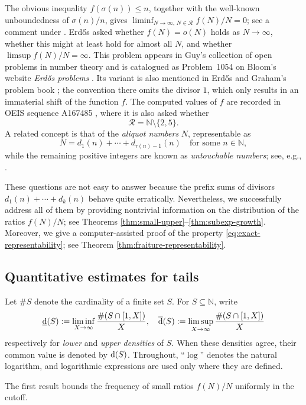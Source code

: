 \documentclass[11pt,letterpaper,reqno]{amsart}
\numberwithin{equation}{section}
\theoremstyle{remark}
\newcommand{\N}{\mathbb{N}}
\newcommand{\Rcal}{\mathcal{R}}
\newcommand{\lowerdens}{\underline{\textup{d}}}
\newcommand{\upperdens}{\overline{\textup{d}}}
\renewcommand{\leq}{\leqslant}
\begin{document}
The obvious inequality $f(\sigma(n))\leq n$, together with the
well-known unboundedness of $\sigma(n)/n$, gives
$\liminf_{N\to\infty,\,N\in\Rcal}f(N)/N=0$; see a comment under \cite{OEIS1054}.
Erd\H{o}s asked whether $f(N)=o(N)$ holds as $N\to\infty$, whether this might at least hold for almost all $N$, and whether $\limsup f(N)/N=\infty$.
This problem appears in Guy's collection of open problems in number theory \cite[Problem B2]{Guy} and is
catalogued as Problem~1054 on Bloom's website \emph{Erd\H{o}s problems} \cite{Bloom1054}. Its variant is also mentioned in
Erd\H{o}s and Graham's problem book \cite[p.~93]{ErdosGraham}; the convention there omits the divisor $1$, which only results in an immaterial shift of the function $f$.
The computed values of $f$ are recorded in OEIS sequence A167485 \cite{OEIS1054}, where it is also asked whether
\begin{equation}\label{eq:exact-representability}
 \Rcal=\N\setminus\{2,5\}.
\end{equation}
A related concept is that of the \emph{aliquot numbers} $N$, representable as
\[
 N=d_1(n)+\cdots+d_{\tau(n)-1}(n)
 \quad\text{for some }n\in\N,
\]
while the remaining positive integers are known as \emph{untouchable numbers}; see, e.g., \cite{ChenZhao}.

These questions are not easy to answer because the prefix sums of divisors $d_1(n)+\cdots+d_k(n)$ behave quite erratically.
Nevertheless, we successfully address all of them by providing nontrivial information on the distribution of the ratios $f(N)/N$; see Theorems \ref{thm:small-upper}--\ref{thm:subexp-growth}.
Moreover, we give a computer-assisted proof of the property \eqref{eq:exact-representability}; see Theorem \ref{thm:fraiture-representability}.


\subsection{Quantitative estimates for tails}

Let $\#S$ denote the cardinality of a finite set $S$.
For $S\subseteq\N$, write
\[
 \lowerdens(S):=\liminf_{X\to\infty}\frac{\#(S\cap[1,X])}{X},
 \quad
 \upperdens(S):=\limsup_{X\to\infty}\frac{\#(S\cap[1,X])}{X}
\]
respectively for \emph{lower} and \emph{upper densities} of $S$.
When these densities agree, their common value is denoted by $\textup{d}(S)$.
Throughout, ``$\log$'' denotes the natural logarithm, and logarithmic
expressions are used only where they are defined.

The first result bounds the frequency
of small ratios $f(N)/N$ uniformly in the cutoff.
\end{document}
